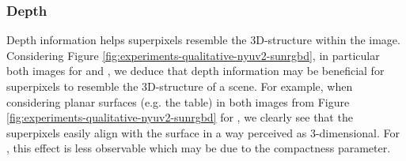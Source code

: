 \subsubsection{Depth}
\label{subsubsec:experiments-qualitative-depth}

Depth information helps superpixels resemble the 3D-structure within the image.
Considering Figure \ref{fig:experiments-qualitative-nyuv2-sunrgbd}, in particular
both images for \DASP and \VCCS, we deduce that depth information may be beneficial
for superpixels to resemble the 3D-structure of a scene. For example, when considering
planar surfaces (e.g. the table) in both images from Figure \ref{fig:experiments-qualitative-nyuv2-sunrgbd} for
\DASP, we clearly see that the superpixels easily align with the surface in a way perceived as 3-dimensional.
For \VCCS, this effect is less observable which may be due to the compactness parameter.
